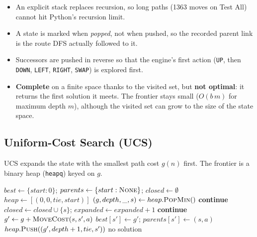 \begin{itemize}[leftmargin=*]
\item An explicit stack replaces recursion, so long paths (1363 moves on Test All) cannot hit
Python's recursion limit.
\item A state is marked when \emph{popped}, not when pushed, so the recorded parent link is the
route DFS actually followed to it.
\item Successors are pushed in reverse so that the engine's first action (\texttt{UP}, then
\texttt{DOWN}, \texttt{LEFT}, \texttt{RIGHT}, \texttt{SWAP}) is explored first.
\item \textbf{Complete} on a finite space thanks to the visited set, but \textbf{not optimal}: it
returns the first solution it meets. The frontier stays small ($O(b\,m)$ for maximum depth $m$),
although the visited set can grow to the size of the state space.
\end{itemize}

\subsection{Uniform-Cost Search (UCS)}

UCS expands the state with the smallest path cost $g(n)$ first. The frontier is a binary heap
(\texttt{heapq}) keyed on $g$.

\begin{algorithm}[H]
\caption{UCS (\texttt{solvers/ucs.py})}
\label{alg:ucs}
\begin{algorithmic}[1]
\State $best \gets \{start: 0\}$; $parents \gets \{start: \textsc{None}\}$; $closed \gets \emptyset$
\State $heap \gets [(0, 0, tie, start)]$ 
  \State $(g, depth, \_, s) \gets heap.\textsc{PopMin}()$
   \textbf{continue} \EndIf
   \Return {} \EndIf
  \State $closed \gets closed \cup \{s\}$; $expanded \gets expanded + 1$
     \textbf{continue} \EndIf
    \State $g' \gets g + \Call{MoveCost}{s, s', a}$
      \State $best[s'] \gets g'$; $parents[s'] \gets (s, a)$
      \State $heap.\textsc{Push}((g', depth + 1, tie, s'))$
    \EndIf
  \EndFor
\EndWhile
\State \Return no solution
\end{algorithmic}
\end{algorithm}

